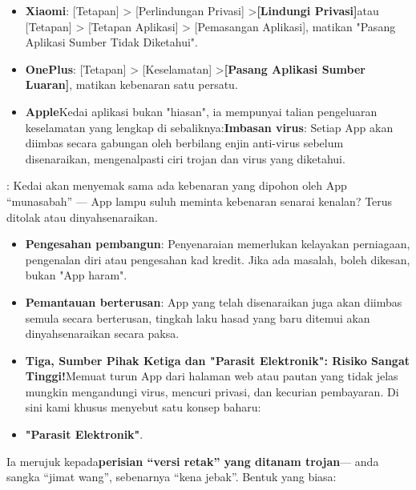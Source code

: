 
\begin{itemize}
  \item \textbf{Xiaomi}: [Tetapan] > [Perlindungan Privasi] >\textbf{[Lindungi Privasi]}atau [Tetapan] > [Tetapan Aplikasi] > [Pemasangan Aplikasi], matikan "Pasang Aplikasi Sumber Tidak Diketahui".
  \item \textbf{OnePlus}: [Tetapan] > [Keselamatan] >\textbf{[Pasang Aplikasi Sumber Luaran]}, matikan kebenaran satu persatu.
  \item \textbf{Apple}Kedai aplikasi bukan "hiasan", ia mempunyai talian pengeluaran keselamatan yang lengkap di sebaliknya:\textbf{Imbasan virus}: Setiap App akan diimbas secara gabungan oleh berbilang enjin anti-virus sebelum disenaraikan, mengenalpasti ciri trojan dan virus yang diketahui.
\end{itemize}


: Kedai akan menyemak sama ada kebenaran yang dipohon oleh App “munasabah” — App lampu suluh meminta kebenaran senarai kenalan? Terus ditolak atau dinyahsenaraikan.

\begin{itemize}
  \item \textbf{Pengesahan pembangun}: Penyenaraian memerlukan kelayakan perniagaan, pengenalan diri atau pengesahan kad kredit. Jika ada masalah, boleh dikesan, bukan "App haram".
  \item \textbf{Pemantauan berterusan}: App yang telah disenaraikan juga akan diimbas semula secara berterusan, tingkah laku hasad yang baru ditemui akan dinyahsenaraikan secara paksa.
  \item \textbf{Tiga, Sumber Pihak Ketiga dan "Parasit Elektronik": Risiko Sangat Tinggi!}Memuat turun App dari halaman web atau pautan yang tidak jelas mungkin mengandungi virus, mencuri privasi, dan kecurian pembayaran. Di sini kami khusus menyebut satu konsep baharu:
  \item \textbf{"Parasit Elektronik"}.
\end{itemize}


Ia merujuk kepada\textbf{perisian “versi retak” yang ditanam trojan}— anda sangka “jimat wang”, sebenarnya “kena jebak”. Bentuk yang biasa:

